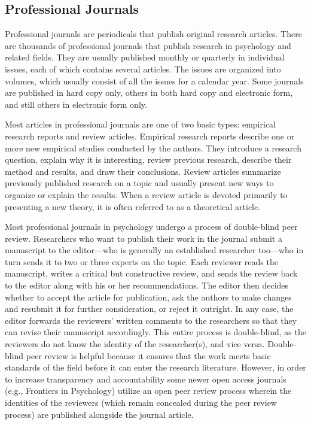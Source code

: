 \documentclass[]{book}
\theoremstyle{definition}
\theoremstyle{definition}
\theoremstyle{remark}
\begin{document}
\subsection{Professional Journals}\label{professional-journals}

Professional journals are periodicals that publish original research
articles. There are thousands of professional journals that publish
research in psychology and related fields. They are usually published
monthly or quarterly in individual issues, each of which contains
several articles. The issues are organized into volumes, which usually
consist of all the issues for a calendar year. Some journals are
published in hard copy only, others in both hard copy and electronic
form, and still others in electronic form only.

Most articles in professional journals are one of two basic types:
empirical research reports and review articles. Empirical research
reports describe one or more new empirical studies conducted by the
authors. They introduce a research question, explain why it is
interesting, review previous research, describe their method and
results, and draw their conclusions. Review articles summarize
previously published research on a topic and usually present new ways to
organize or explain the results. When a review article is devoted
primarily to presenting a new theory, it is often referred to as a
theoretical article.

Most professional journals in psychology undergo a process of
double-blind peer review. Researchers who want to publish their work in
the journal submit a manuscript to the editor---who is generally an
established researcher too---who in turn sends it to two or three
experts on the topic. Each reviewer reads the manuscript, writes a
critical but constructive review, and sends the review back to the
editor along with his or her recommendations. The editor then decides
whether to accept the article for publication, ask the authors to make
changes and resubmit it for further consideration, or reject it
outright. In any case, the editor forwards the reviewers' written
comments to the researchers so that they can revise their manuscript
accordingly. This entire process is double-blind, as the reviewers do
not know the identity of the researcher(s), and vice versa. Double-blind
peer review is helpful because it ensures that the work meets basic
standards of the field before it can enter the research literature.
However, in order to increase transparency and accountability some newer
open access journals (e.g., Frontiers in Psychology) utilize an open
peer review process wherein the identities of the reviewers (which
remain concealed during the peer review process) are published alongside
the journal article.
\end{document}
